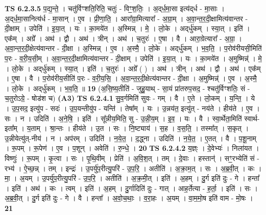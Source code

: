 \documentclass[17pt]{extarticle}
\begin{document}
                  \newline
                                \textbf{ TS 6.2.3.5} \newline
                  प॒द्य॒न्ते॒ । चतु॑र्विꣳशति॒रिति॒ चतुः॑ - विꣳ॒॒श॒तिः॒ । अ॒द्‌र्ध॒मा॒सा इत्य॑द्‌र्ध - मा॒साः । अ॒द्‌र्ध॒मा॒सानित्य॑र्ध - मा॒सान् । ए॒व । प्री॒णा॒ति॒ । आरा᳚ग्रा॒मित्यारा᳚ - अ॒ग्रा॒म् । अ॒वा॒न्त॒र॒दी॒क्षामित्य॑वान्तर - दी॒क्षाम् । उपेति॑ । इ॒या॒त् । यः । का॒मये॑त । अ॒स्मिन्न् । मे॒ । लो॒के । अद्‌र्धु॑कम् । स्या॒त् । इति॑ । एक᳚म् । अग्रे᳚ । अथ॑ । द्वौ । अथ॑ । त्रीन् । अथ॑ । च॒तुरः॑ । ए॒षा । वै । आरा॒ग्रेत्यारा᳚ - अ॒ग्रा॒ । अ॒वा॒न्त॒र॒दी॒क्षेत्य॑वान्तर - दी॒क्षा । अ॒स्मिन्न् । ए॒व । अ॒स्मै॒ । लो॒के । अद्‌र्धु॑कम् । भ॒व॒ति॒ । प॒रोव॑रीयसी॒मिति॑ प॒रः - व॒री॒य॒सी॒म् । अ॒वा॒न्त॒र॒दी॒क्षामित्य॑वान्तर - दी॒क्षाम् । उपेति॑ । इ॒या॒त् । यः । का॒मये॑त । अ॒मुष्मिन्न्॑ । मे॒ । लो॒के । अद्‌र्धु॑कम् । स्या॒त् । इति॑ । च॒तुरः॑ । अग्रे᳚ ( ) । अथ॑ । त्रीन् । अथ॑ । द्वौ । अथ॑ । एक᳚म् । ए॒षा । वै । प॒रोव॑रीय॒सीति॑ प॒रः - व॒री॒य॒सि॒ । अ॒वा॒न्त॒र॒दी॒क्षेत्य॑वान्तर - दी॒क्षा । अ॒मुष्मिन्न्॑ । ए॒व । अ॒स्मै॒ । लो॒के । अद्‌र्धु॑कम् । भ॒व॒ति॒ ॥ \textbf{  19} \newline
                  \newline
                      (अ॒सि॒ष्य॒तीति॑ - जुहु॒याथ् - सा॒यं प्रा॑तरुप॒सद॒ - श्चतु॑र्विꣳशतिः॒ सं - च॒तुरोऽग्रे॒ - षोड॑श च)  \textbf{(A3)} \newline \newline
                                \textbf{ TS 6.2.4.1} \newline
                  सु॒व॒र्गमिति॑ सुवः - गम् । वै । ए॒ते । लो॒कम् । य॒न्ति॒ । ये । उ॒प॒सद॒ इत्यु॑प - सदः॑ । उ॒प॒यन्तीयु॑प - यन्ति॑ । तेषा᳚म् । यः । उ॒न्नय॑त॒ इत्यु॑त् - नय॑ते । हीय॑ते । ए॒व । सः । न । उदिति॑ । अ॒ने॒षि॒ । इति॑ । सू᳚न्नीय॒मिति॒ सु - उ॒न्नी॒य॒म् । इ॒व॒ । यः । वै । स्वा॒र्थेता॒मिति॑ स्वार्थ-इता᳚म् । य॒ताम् । श्रा॒न्तः । हीय॑ते । उ॒त । सः । नि॒ष्ट्याय॑ । स॒ह । व॒स॒ति॒ । तस्मा᳚त् । स॒कृत् । उ॒न्नीयेत्यु॑त्-नीय॑ । न । अप॑रम् । उदिति॑ । न॒ये॒त॒ । द॒द्ध्ना । उदिति॑ । न॒ये॒त॒ । ए॒तत् । वै । प॒शू॒नाम् । रू॒पम् । रू॒पेण॑ । ए॒व । प॒शून् । अवेति॑ । रु॒न्धे॒ । \textbf{  20} \newline
                  \newline
                                \textbf{ TS 6.2.4.2} \newline
                  य॒ज्ञ्ः । दे॒वेभ्यः॑ । निला॑यत । विष्णुः॑ । रू॒पम् । कृ॒त्वा । सः । पृ॒थि॒वीम् । प्रेति॑ । अ॒वि॒श॒त् । तम् । दे॒वाः । हस्तान्॑ । सꣳ॒॒रभ्येति॑ सं - रभ्य॑ । ऐ॒च्छ॒न्न् । तम् । इन्द्रः॑ । उ॒पर्यु॑प॒रीत्यु॒परि॑ - उ॒प॒रि॒ । अतीति॑ । अ॒क्रा॒म॒त् । सः । अ॒ब्र॒वी॒त् । कः । मा॒ । अ॒यम् । उ॒पर्यु॑प॒रीत्यु॒परि॑ - उ॒प॒रि॒ । अतीति॑ । अ॒क्र॒मी॒त् । इति॑ । अ॒हम् । दु॒र्ग इति॑ दुः - गे । हन्ता᳚ । इति॑ । अथ॑ । कः । त्वम् । इति॑ । अ॒हम् । दु॒र्गादिति॑ दुः - गात् । आह॒र्तेत्या - ह॒र्ता॒ । इति॑ । सः । अ॒ब्र॒वी॒त् । दु॒र्ग इति॑ दुः - गे । वै । हन्ता᳚ । अ॒वो॒च॒थाः॒ । व॒रा॒हः । अ॒यम् । वा॒म॒मो॒ष इति॑ वाम - मो॒षः । \textbf{  21} \newline
\end{document}
